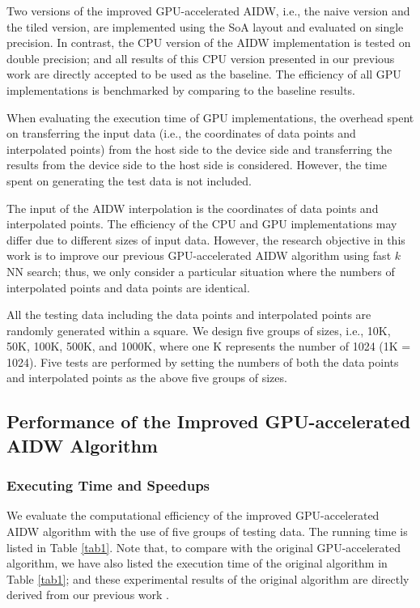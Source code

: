 \documentclass[final,5p,times,twocolumn,authoryear]{elsarticle}
\begin{document}
			Two versions of the improved GPU-accelerated AIDW, i.e., the naive version 
			and the tiled version, are implemented using the SoA layout and evaluated on 
			single precision. In contrast, the CPU version of the AIDW implementation is 
			tested on double precision; and all results of this CPU version 
			presented in our previous work \citep{29DBLP:journals/corr/MeiXX15} are directly accepted to be used as the 
			baseline. The efficiency of all GPU implementations is benchmarked by 
			comparing to the baseline results.
			
			When evaluating the execution time of GPU implementations, the overhead 
			spent on transferring the input data (i.e., the coordinates of data points 
			and interpolated points) from the host side to the device side and 
			transferring the results from the device side to the host side is 
			considered. However, the time spent on generating the test data is not 
			included. 
			
			The input of the AIDW interpolation is the coordinates of data points and 
			interpolated points. The efficiency of the CPU and GPU implementations may 
			differ due to different sizes of input data. However, the research objective 
			in this work is to improve our previous GPU-accelerated AIDW algorithm using 
			fast $k$NN search; thus, we only consider a particular situation where the 
			numbers of interpolated points and data points are identical.
			
			All the testing data including the data points and interpolated points are 
			randomly generated within a square. We design five groups of sizes, i.e., 
			10K, 50K, 100K, 500K, and 1000K, where one K represents the number of 1024 
			(1K = 1024). Five tests are performed by setting the numbers of both the 
			data points and interpolated points as the above five groups of sizes.
			
			\subsection{Performance of the Improved GPU-accelerated AIDW Algorithm}
			\subsubsection{Executing Time and Speedups}
			
			We evaluate the computational efficiency of the improved GPU-accelerated 
			AIDW algorithm with the use of five groups of testing data. The running time 
			is listed in Table \ref{tab1}. Note that, to compare with the original 
			GPU-accelerated algorithm, we have also listed the execution time of the 
			original algorithm in Table \ref{tab1}; and these experimental results of the original algorithm are directly 
			derived from our previous work \citep{29DBLP:journals/corr/MeiXX15}.
			
\end{document}
